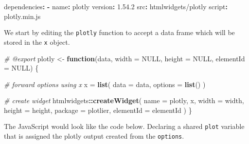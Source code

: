 \documentclass[
]{krantz}
\makeatletter
\newenvironment{Shaded}{\begin{snugshade}}{\end{snugshade}}
\newcommand{\AttributeTok}[1]{\textcolor[rgb]{0.61,0.61,0.61}{#1}}
\newcommand{\CommentTok}[1]{\textcolor[rgb]{0.37,0.37,0.37}{\textit{#1}}}
\newcommand{\ControlFlowTok}[1]{\textcolor[rgb]{0.27,0.27,0.27}{\textbf{#1}}}
\newcommand{\DataTypeTok}[1]{\textcolor[rgb]{0.27,0.27,0.27}{#1}}
\newcommand{\FloatTok}[1]{\textcolor[rgb]{0.06,0.06,0.06}{#1}}
\newcommand{\FunctionTok}[1]{\textcolor[rgb]{0,0,0}{#1}}
\newcommand{\KeywordTok}[1]{\textcolor[rgb]{0.27,0.27,0.27}{\textbf{#1}}}
\newcommand{\NormalTok}[1]{#1}
\newcommand{\OperatorTok}[1]{\textcolor[rgb]{0.43,0.43,0.43}{\textbf{#1}}}
\newcommand{\OtherTok}[1]{\textcolor[rgb]{0.37,0.37,0.37}{#1}}
\newcommand{\StringTok}[1]{\textcolor[rgb]{0.5,0.5,0.5}{#1}}
\newenvironment{kframe}{%
\medskip{}
\setlength{\fboxsep}{.8em}
 \def\at@end@of@kframe{}%
 \ifinner\ifhmode%
  \def\at@end@of@kframe{\end{minipage}}%
  \begin{minipage}{\columnwidth}%
 \fi\fi%
 \def\FrameCommand##1{\hskip\@totalleftmargin \hskip-\fboxsep
 \colorbox{shadecolor}{##1}\hskip-\fboxsep
     \hskip-\linewidth \hskip-\@totalleftmargin \hskip\columnwidth}%
 \MakeFramed {\advance\hsize-\width
   \@totalleftmargin\z@ \linewidth\hsize
   \@setminipage}}%
 {\par\unskip\endMakeFramed%
 \at@end@of@kframe}
\renewenvironment{Shaded}{\begin{kframe}}{\end{kframe}}
\makeatother
\begin{document}
\begin{Shaded}
\begin{Highlighting}[]
\FunctionTok{dependencies}\KeywordTok{:}
\AttributeTok{ }\KeywordTok{{-}}\AttributeTok{ }\FunctionTok{name}\KeywordTok{:}\AttributeTok{ plotly}
\AttributeTok{   }\FunctionTok{version}\KeywordTok{:}\AttributeTok{ }\FloatTok{1.54.2}
\AttributeTok{   }\FunctionTok{src}\KeywordTok{:}\AttributeTok{ htmlwidgets/plotly}
\AttributeTok{   }\FunctionTok{script}\KeywordTok{:}\AttributeTok{ plotly.min.js}
\end{Highlighting}
\end{Shaded}

We start by editing the \texttt{plotly} function to accept a data frame which will be stored in the \texttt{x} object.

\begin{Shaded}
\begin{Highlighting}[]
\CommentTok{\#\textquotesingle{} @export}
\NormalTok{plotly \textless{}{-}}\StringTok{ }\ControlFlowTok{function}\NormalTok{(data, }\DataTypeTok{width =} \OtherTok{NULL}\NormalTok{, }\DataTypeTok{height =} \OtherTok{NULL}\NormalTok{, }\DataTypeTok{elementId =} \OtherTok{NULL}\NormalTok{) \{}

  \CommentTok{\# forward options using x}
\NormalTok{  x =}\StringTok{ }\KeywordTok{list}\NormalTok{(}
    \DataTypeTok{data =}\NormalTok{ data,}
    \DataTypeTok{options =} \KeywordTok{list}\NormalTok{()}
\NormalTok{  )}

  \CommentTok{\# create widget}
\NormalTok{  htmlwidgets}\OperatorTok{::}\KeywordTok{createWidget}\NormalTok{(}
    \DataTypeTok{name =} \StringTok{\textquotesingle{}plotly\textquotesingle{}}\NormalTok{,}
\NormalTok{    x,}
    \DataTypeTok{width =}\NormalTok{ width,}
    \DataTypeTok{height =}\NormalTok{ height,}
    \DataTypeTok{package =} \StringTok{\textquotesingle{}plotlier\textquotesingle{}}\NormalTok{,}
    \DataTypeTok{elementId =}\NormalTok{ elementId}
\NormalTok{  )}
\NormalTok{\}}
\end{Highlighting}
\end{Shaded}

The JavaScript would look like the code below. Declaring a shared \texttt{plot} variable that is assigned the plotly output created from the \texttt{options}.
\end{document}

